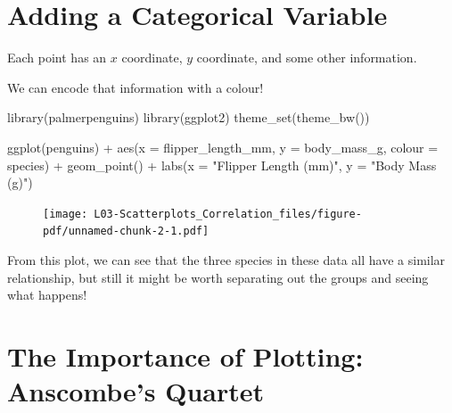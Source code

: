 \documentclass[
  letterpaper,
  DIV=11,
  numbers=noendperiod]{scrreprt}
\newenvironment{Shaded}{\begin{snugshade}}{\end{snugshade}}
\newcommand{\AttributeTok}[1]{\textcolor[rgb]{0.40,0.45,0.13}{#1}}
\newcommand{\FunctionTok}[1]{\textcolor[rgb]{0.28,0.35,0.67}{#1}}
\newcommand{\NormalTok}[1]{\textcolor[rgb]{0.00,0.23,0.31}{#1}}
\newcommand{\SpecialCharTok}[1]{\textcolor[rgb]{0.37,0.37,0.37}{#1}}
\newcommand{\StringTok}[1]{\textcolor[rgb]{0.13,0.47,0.30}{#1}}
\begin{document}
\hypertarget{adding-a-categorical-variable}{%
\section{Adding a Categorical
Variable}\label{adding-a-categorical-variable}}

\vspace{1cm}

Each point has an \(x\) coordinate, \(y\) coordinate, and some other
information.

\pspace

We can encode that information with a colour!

\begin{Shaded}
\begin{Highlighting}[]
\FunctionTok{library}\NormalTok{(palmerpenguins)}
\FunctionTok{library}\NormalTok{(ggplot2)}
\FunctionTok{theme\_set}\NormalTok{(}\FunctionTok{theme\_bw}\NormalTok{())}

\FunctionTok{ggplot}\NormalTok{(penguins) }\SpecialCharTok{+} 
    \FunctionTok{aes}\NormalTok{(}\AttributeTok{x =}\NormalTok{ flipper\_length\_mm, }\AttributeTok{y =}\NormalTok{ body\_mass\_g,}
        \AttributeTok{colour =}\NormalTok{ species) }\SpecialCharTok{+}
    \FunctionTok{geom\_point}\NormalTok{() }\SpecialCharTok{+}
    \FunctionTok{labs}\NormalTok{(}\AttributeTok{x =} \StringTok{"Flipper Length (mm)"}\NormalTok{,}
        \AttributeTok{y =} \StringTok{"Body Mass (g)"}\NormalTok{)}
\end{Highlighting}
\end{Shaded}

\begin{figure}[H]

{\centering \texttt{[image: L03-Scatterplots\_Correlation\_files/figure-pdf/unnamed-chunk-2-1.pdf]}

}

\end{figure}

From this plot, we can see that the three species in these data all have
a similar relationship, but still it might be worth separating out the
groups and seeing what happens!

\hypertarget{the-importance-of-plotting-anscombes-quartet}{%
\section{The Importance of Plotting: Anscombe's
Quartet}\label{the-importance-of-plotting-anscombes-quartet}}
\end{document}
